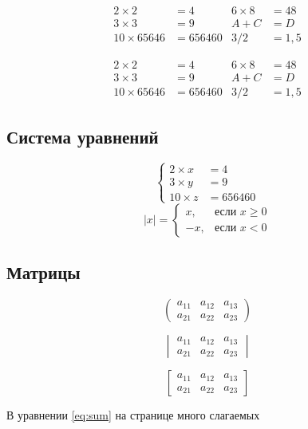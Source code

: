 \documentclass[a4paper,12pt,leqno]{article} %
\begin{document}
\begin{align*}
2\times 2&=4 & 6\times 8 &=48\\
3\times 3&=9 & A+C&=D\\
10\times 65646 &= 656460 & 3/2&=1,5
\end{align*}

\begin{equation}
\begin{aligned}
2\times 2&=4 & 6\times 8 &=48\\
3\times 3&=9 & A+C&=D\\
10\times 65646 &= 656460 & 3/2&=1,5	
\end{aligned}
\end{equation}

\subsection{Система уравнений}

\[
	\left\{
		\begin{aligned}
			2\times x&=4 \\
			3\times y&=9 \\
			10\times z &= 656460 	
		\end{aligned}
	\right.
\]
\[
	|x| = \begin{cases}
	x, &\text{если } x \ge 0 \\
	-x, &\text{если } x < 0
	\end{cases}
\]

\subsection{Матрицы}

\[
	\begin{pmatrix}
	a_{11} & a_{12} & a_{13} \\
	a_{21} & a_{22} & a_{23}
	\end{pmatrix}
\]


\[
\begin{vmatrix}
a_{11} & a_{12} & a_{13} \\
a_{21} & a_{22} & a_{23}
\end{vmatrix}
\]


\[
\begin{bmatrix}
a_{11} & a_{12} & a_{13} \\
a_{21} & a_{22} & a_{23}
\end{bmatrix}
\]

В уравнении \eqref{eq:sum} на странице \pageref{eq:sum} много слагаемых
\end{document}
